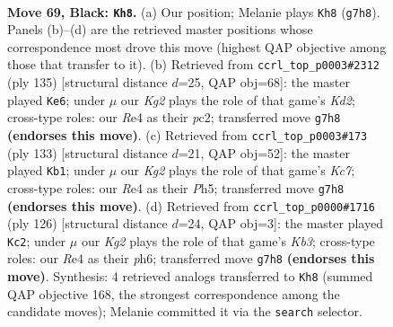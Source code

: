 \documentclass[11pt]{article}
\begin{document}
\clearpage

\begin{figure}[p]\centering
\begin{subfigure}{0.46\textwidth}\centering
\resizebox{\linewidth}{!}{%
\newchessgame
\chessboard[
  setfen={8/3Q2k1/5p1q/3p4/4r3/6P1/6KP/8 b - - 19 69},
  showmover=false,
  pgfstyle=straightmove, color=movearrow, markmove={g7-h8}
]}
\caption{}
\end{subfigure}\hfill
\begin{subfigure}{0.46\textwidth}\centering
\resizebox{\linewidth}{!}{%
\newchessgame
\chessboard[
  setfen={8/Q2k4/3p4/7p/p5q1/1P6/1KP5/8 b - - 15 68},
  showmover=false,
  pgfstyle=straightmove, color=movearrow, markmove={d7-e6}
]}
\caption{}
\end{subfigure}
\\[4pt]
\begin{subfigure}{0.46\textwidth}\centering
\resizebox{\linewidth}{!}{%
\newchessgame
\chessboard[
  setfen={8/8/8/7p/7P/pq4P1/2k1QPK1/8 b - - 11 67},
  showmover=false,
  pgfstyle=straightmove, color=movearrow, markmove={c2-b1}
]}
\caption{}
\end{subfigure}\hfill
\begin{subfigure}{0.46\textwidth}\centering
\resizebox{\linewidth}{!}{%
\newchessgame
\chessboard[
  setfen={7k/6p1/P2qp2p/8/2Q3P1/1K5P/8/8 w - - 19 64},
  showmover=false,
  pgfstyle=straightmove, color=movearrow, markmove={b3-c2}
]}
\caption{}
\end{subfigure}
\caption{\textbf{Move 69, Black: \texttt{Kh8}.} (a) Our position; Melanie plays \texttt{Kh8} (\texttt{g7h8}). Panels (b)--(d) are the retrieved master positions whose correspondence most drove this move (highest QAP objective among those that transfer to it). (b) Retrieved from \texttt{ccrl\_top\_p0003\#2312} (ply 135) [structural distance $d$=25, QAP obj=68]: the master played \texttt{Ke6}; under $\mu$ our \emph{Kg2} plays the role of that game's \emph{Kd2}; cross-type roles: our \emph{R}e4 as their \emph{p}c2; transferred move \texttt{g7h8} \textbf{(endorses this move)}. (c) Retrieved from \texttt{ccrl\_top\_p0003\#173} (ply 133) [structural distance $d$=21, QAP obj=52]: the master played \texttt{Kb1}; under $\mu$ our \emph{Kg2} plays the role of that game's \emph{Kc7}; cross-type roles: our \emph{R}e4 as their \emph{P}h5; transferred move \texttt{g7h8} \textbf{(endorses this move)}. (d) Retrieved from \texttt{ccrl\_top\_p0000\#1716} (ply 126) [structural distance $d$=24, QAP obj=3]: the master played \texttt{Kc2}; under $\mu$ our \emph{Kg2} plays the role of that game's \emph{Kb3}; cross-type roles: our \emph{R}e4 as their \emph{p}h6; transferred move \texttt{g7h8} \textbf{(endorses this move)}. Synthesis: 4 retrieved analogs transferred to \texttt{Kh8} (summed QAP objective 168, the strongest correspondence among the candidate moves); Melanie committed it via the \texttt{search} selector.}
\label{fig:thought-m137}
\end{figure}
\end{document}
